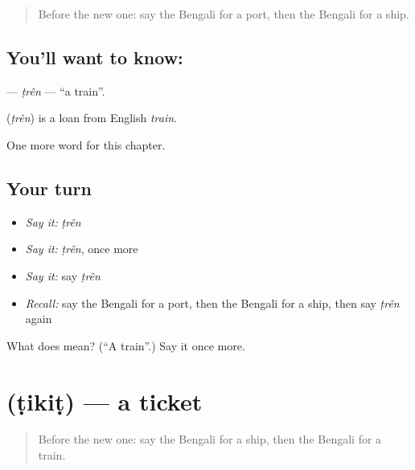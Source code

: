 \label{lesson:BN-C128-tren}



\begin{quote}
Before the new one: say the Bengali for a port, then the Bengali for a ship.
\end{quote}

\subsection*{You'll want to know: }
\textbf{} — \emph{ṭrên} — \textquotedblleft{}a train\textquotedblright{}.

\begin{cousinweb}
\textbf{} (\emph{ṭrên}) is a loan from English \emph{train}.
\end{cousinweb}

\begin{grammarlens}[title={What you've built}]
One more word for this chapter.
\end{grammarlens}

\subsection*{Your turn}
\begin{itemize}
\raggedright
  \item \emph{Say it:} \emph{ṭrên}
  \item \emph{Say it:} \emph{ṭrên}, once more
  \item \emph{Say it:} say \emph{ṭrên}
  \item \emph{Recall:} say the Bengali for a port, then the Bengali for a ship, then say \emph{ṭrên} again
\end{itemize}

\begin{tcolorbox}[breakable,colback=teal!4,colframe=teal!35!black,title={Before you move on}]
What does  mean? (\textquotedblleft{}A train\textquotedblright{}.) Say it once more.
\end{tcolorbox}
\section[\texorpdfstring{\bn{টিকিট} (ṭikiṭ)}{টিকিট (ṭikiṭ)}]{ (ṭikiṭ) — a ticket}

\label{lesson:BN-C128-tikit}



\begin{quote}
Before the new one: say the Bengali for a ship, then the Bengali for a train.
\end{quote}

